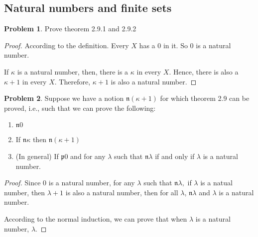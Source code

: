 \documentclass[a4paper,11pt]{article}%
\theoremstyle{remark}
\theoremstyle{definition}
\newtheorem{problem}{Problem}[subsection]
\begin{document}
\subsection{Natural numbers and finite sets}
\begin{problem}
    Prove theorem 2.9.1 and 2.9.2
    \begin{proof}
        According to the definition. Every $X$ has a 0 in it.
        So 0 is a natural number.

        If $\kappa$ is a natural number, then, there is a $\kappa$ in 
        every $X$. Hence, there is also a $\kappa+1$ in every $X$.
        Therefore, $\kappa+1$ is also a natural number.
    \end{proof}
\end{problem}
\begin{problem}
    Suppose we have a notion $\mathfrak{n}(\kappa+1)$ for which theorem 2.9
    can be proved, i.e., such that we can prove the following:
    \begin{enumerate}
        \item $\mathfrak{n}0$
        \item If $\mathfrak{n}\kappa$ then $\mathfrak{n}(\kappa+1)$
        \item (In general) If $\mathfrak{p}0$ and for any $\lambda$ such
        that $\mathfrak{n}\lambda$ if and only if $\lambda$ is a natural number.
    \end{enumerate}
    \begin{proof}
    Since 0 is a natural number, for any $\lambda$ such that $\mathfrak{n}\lambda,$
    if $\lambda$ is a natual number, then $\lambda+1$ is also a natural number,
    then for all $\lambda$, $\mathfrak{n}\lambda$ and $\lambda$ is a natural number.

    According to the normal induction, we can prove that when $\lambda$ is a 
    natural number, $\mathfrak{\lambda}$.
    \end{proof}
\end{problem}
\end{document}
